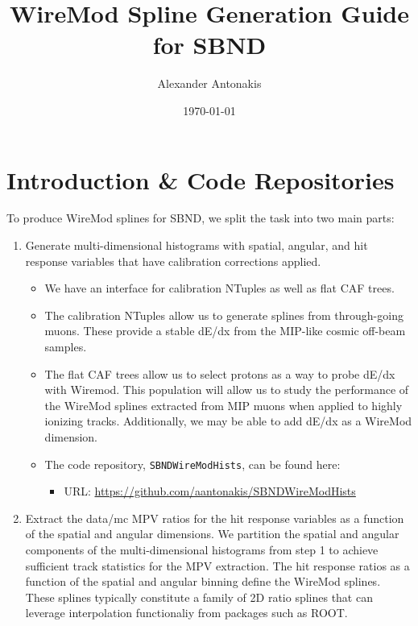 \documentclass{article}
\title{WireMod Spline Generation Guide for SBND}
\author[1]{Alexander Antonakis}
\affil[1]{University of California, Santa Barbara}
\date{\today}
\begin{document}
\renewcommand{\arraystretch}{1.25}
\linenumbers
\maketitle



\tableofcontents

\newpage



\section{Introduction \& Code Repositories}

To produce WireMod splines for SBND, we split the task into two main parts:

\begin{enumerate}
    \item Generate multi-dimensional histograms with spatial, angular, and hit response variables that have calibration corrections applied. 
    \begin{itemize}
        \item We have an interface for calibration NTuples as well as flat CAF trees. 
        \item The calibration NTuples allow us to generate splines from through-going muons. These provide a stable dE/dx from the MIP-like cosmic off-beam samples.
        \item The flat CAF trees allow us to select protons as a way to probe dE/dx with Wiremod. This population will allow us to study the performance of the WireMod splines extracted from MIP muons when applied to highly ionizing tracks. Additionally, we may be able to add dE/dx as a WireMod dimension. 
        \item The code repository, \texttt{SBNDWireModHists}, can be found here: 
        \begin{itemize}
            \item URL: \href{https://github.com/aantonakis/SBNDWireModHists}{https://github.com/aantonakis/SBNDWireModHists}
        \end{itemize}
    \end{itemize}
    
    \item Extract the data/mc MPV ratios for the hit response variables as a function of the spatial and angular dimensions. We partition the spatial and angular components of the multi-dimensional histograms from step 1 to achieve sufficient track statistics for the MPV extraction. The hit response ratios as a function of the spatial and angular binning define the WireMod splines. These splines typically constitute a family of 2D ratio splines that can leverage interpolation functionaliy from packages such as ROOT.
\end{enumerate}
\end{document}
